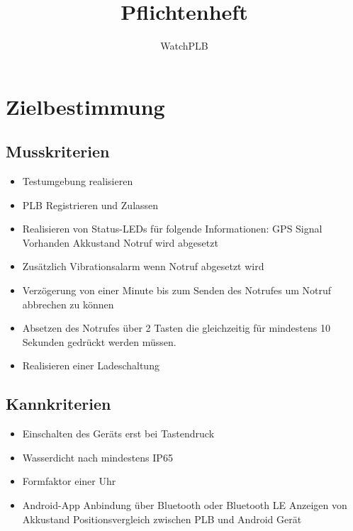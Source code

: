 \documentclass[a4paper]{scrreprt}
\begin{document}
 
\title{Pflichtenheft}
\author{WatchPLB}
\maketitle
 
\begin{abstract}
\end{abstract}
 
\tableofcontents
 
\chapter{Zielbestimmung}
 
\section{Musskriterien}
\begin{itemize}
	\item Testumgebung realisieren
	\item PLB Registrieren und Zulassen

	\item Realisieren von Status-LEDs für folgende Informationen:
		\subitem GPS Signal Vorhanden
		\subitem Akkustand
		\subitem Notruf wird abgesetzt

	\item Zusätzlich Vibrationsalarm wenn Notruf abgesetzt wird

	\item Verzögerung von einer Minute bis zum Senden des Notrufes um Notruf abbrechen zu können

	\item Absetzen des Notrufes über 2 Tasten die gleichzeitig für mindestens 10 Sekunden gedrückt werden müssen.
	
	\item Realisieren einer Ladeschaltung
\end{itemize}

 
\section{Kannkriterien}
\begin{itemize}
	\item Einschalten des Geräts erst bei Tastendruck
	\item Wasserdicht nach mindestens IP65
	\item Formfaktor einer Uhr
	\item Android-App
		\subitem Anbindung über Bluetooth oder Bluetooth LE
		\subitem Anzeigen von Akkustand
		\subitem Positionsvergleich zwischen PLB und Android Gerät
\end{itemize}
 
\end{document}
